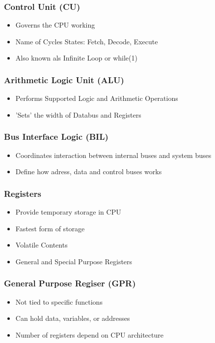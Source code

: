 \begin{multicols}{2}
	\subsubsection{Control Unit (\acs{CU})}   
		\begin{itemize}
			\item Governs the CPU working
			\item Name of Cycles States: Fetch, Decode, Execute
			\item Also known als Infinite Loop or while(1)
		\end{itemize}	
	\subsubsection{Arithmetic Logic Unit (\acs{ALU})}
	\begin{itemize}
		\item Performs Supported Logic and Arithmetic Operations
		\item 'Sets' the width of Databus and Registers
	\end{itemize}	
	\subsubsection{Bus Interface Logic (\acs{BIL})}
	\begin{itemize}
		\item Coordinates interaction between internal buses and system buses
		\item Define how adress, data and control buses works
	\end{itemize}	
	\subsubsection{Registers}
	\begin{itemize}
		\item Provide temporary storage in \acs{CPU}
		\item Fastest form of storage
		\item Volatile Contents
		\item General and Special Purpose Registers
	\end{itemize}
	\subsubsection{General Purpose Regiser (\acs{GPR})}
	\begin{itemize}
		\item Not tied to specific functions
		\item Can hold data, variables, or addresses
		\item Number of registers depend on \acs{CPU} architecture			
	\end{itemize}
	\columnbreak

\end{multicols}
